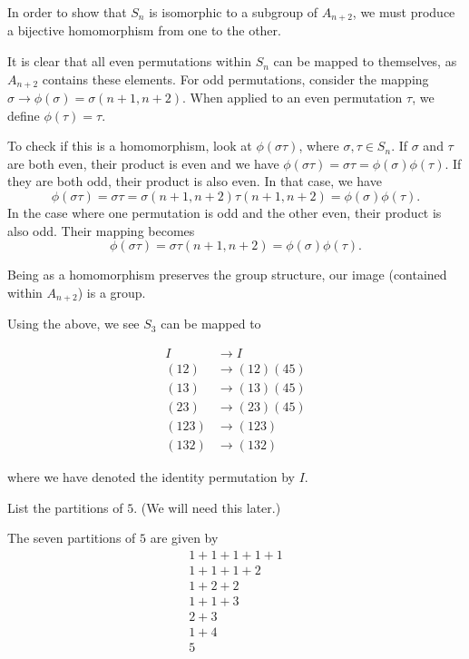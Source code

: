 \documentclass[../group-theory-in-a-nutshell-for-physicists.tex]{subfiles}
\begin{document}
\begin{questions}
\begin{solution}
In order to show that $S_{n}$ is isomorphic to a subgroup of
$A_{n + 2}$, we must produce a bijective homomorphism from one to the
other.

It is clear that all even permutations within $S_{n}$ can be mapped to
themselves, as $A_{n + 2}$ contains these elements. For odd
permutations, consider the mapping
$\sigma \rightarrow \phi(\sigma) = \sigma(n + 1, n + 2)$. When applied to an even permutation $\tau$, we define $\phi(\tau) = \tau$.

To check if this is a homomorphism, look at $\phi(\sigma\tau)$, where
$\sigma,\tau \in S_{n}$. If $\sigma$ and $\tau$ are both even,
their product is even and we have
$\phi(\sigma\tau) = \sigma\tau = \phi(\sigma)\phi(\tau)$. If they are
both odd, their product is also even. In that case, we have
\[
\phi(\sigma\tau) = \sigma\tau = \sigma(n + 1,n + 2)\tau(n + 1,n + 2) = \phi(\sigma)\phi(\tau).
\]
In the case where one permutation is odd and the other even, their
product is also odd. Their mapping becomes
\[
\phi(\sigma\tau) = \sigma\tau(n + 1,n + 2) = \phi(\sigma)\phi(\tau).
\]

Being as a homomorphism preserves the group structure, our image
(contained within $A_{n + 2}$) is a group.

Using the above, we see $S_{3}$ can be mapped to

\begin{align*}
I & \rightarrow I \\
(12) & \rightarrow (12)(45) \\
(13) & \rightarrow (13)(45) \\
(23) & \rightarrow (23)(45) \\
(123) & \rightarrow (123) \\
(132) & \rightarrow (132)
\end{align*}

where we have denoted the identity permutation by $I$.
\end{solution}

\question List the partitions of $5$. (We will need this later.)

\begin{solution}
The seven partitions of $5$ are given by
\begin{gather*}
1 + 1 + 1 + 1 + 1 \\
1 + 1 + 1 + 2 \\
1 + 2 + 2 \\
1 + 1 + 3 \\
2 + 3 \\
1 + 4 \\
5
\end{gather*}
\end{solution}


\end{questions}
\end{document}
